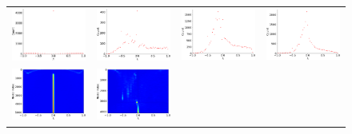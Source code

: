 \documentclass[senior,final,11pt]{iscs-thesis}
\begin{document}
\begin{figure}[htbp]
  \setlength\tabcolsep{0pt}
  \hspace{-3.0cm}
  \begin{tabular}{cccc}
    \includegraphics[width=45mm]{figure/ca-Erdos992mtx_dos.png} &
    \includegraphics[width=45mm]{figure/ca-GrQcmtx_dos.png} &
    \includegraphics[width=45mm]{figure/ca-CondMatmtx_dos.png} &
    \includegraphics[width=45mm]{figure/ca-AstroPhmtx_dos.png} \\
    \includegraphics[width=45mm]{figure/ca-Erdos992mtx_pdos.png} &
    \includegraphics[width=45mm]{figure/ca-GrQcmtx_pdos.png} &

\end{tabular}
\end{figure}
\end{document}
